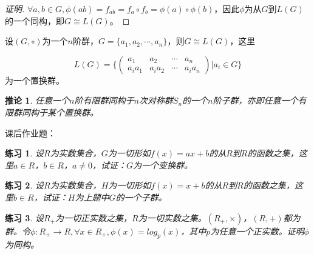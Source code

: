 \documentclass{article}
\newtheorem{Exercise}{练习}
\newtheorem{Cor}{推论}
\begin{document}
\begin{CJK*}{UTF8}{gbsn}
\begin{proof}[证明]
$\forall a,b\in G, \phi(ab)=f_{ab}=f_a\circ f_b=\phi(a)\circ \phi(b)$，因此$\phi$为从$G$到$L(G)$的一个同构，即$G\cong L(G)$。
\end{proof}
设$(G,\circ)$为一个$n$阶群，$G=\{a_1,a_2,\cdots,a_n\}$，则$G\cong L(G)$，这里

\[L(G)=\Big\{\begin{pmatrix}a_1&a_2&\cdots&a_n\\a_ia_1&a_ia_2&\cdots&a_ia_n\end{pmatrix}|a_i\in G\Big\}\]
为一个置换群。
\begin{Cor}
  任意一个$n$阶有限群同构于$n$次对称群$S_n$的一个$n$阶子群，亦即任意一个有限群同构于某个置换群。
\end{Cor}
课后作业题：
\begin{Exercise}
设$R$为实数集合，$G$为一切形如$f(x)=ax+b$的从$R$到$R$的函数之集，这里$a\in R$，$b\in R$，$a\neq 0$，试证：$G$为一个变换群。
\end{Exercise}

\begin{Exercise}
  设$R$为实数集合，$H$为一切形如$f(x)=x+b$的从$R$到$R$的函数之集，这里$b\in R$，试证：$H$为上题中$G$的一个子群。
\end{Exercise}
\begin{Exercise}
设$R_+$为一切正实数之集，$R$为一切实数之集。$(R_+,\times)$，$(R,+)$都为群。令$\phi:R_+\to R,\forall x\in R_+,\phi(x)=log_p(x)$，其中$p$为任意一个正实数。证明$\phi$为同构。
\end{Exercise}
\end{CJK*}
\end{document}
